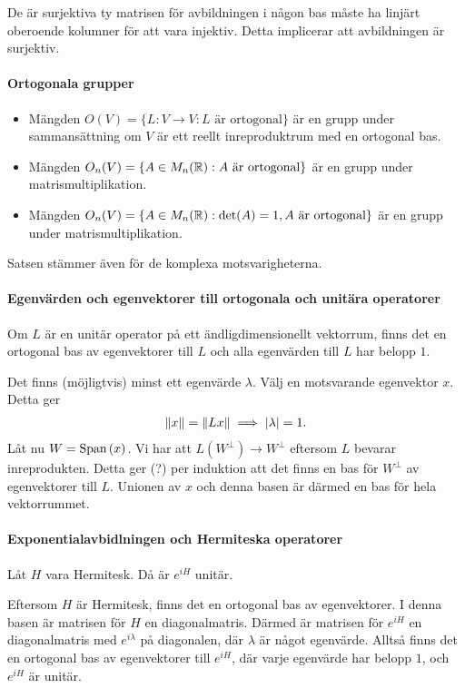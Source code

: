 De är surjektiva ty matrisen för avbildningen i någon bas måste ha linjärt oberoende kolumner för att vara injektiv. Detta implicerar att avbildningen är surjektiv.

\paragraph{Ortogonala grupper}
\begin{itemize}
	\item Mängden $O(V) = \{L: V\to V: L\text{ är ortogonal}\}$ är en grupp under sammansättning om $V$ är ett reellt inreproduktrum med en ortogonal bas.
	\item Mängden $O_{n}(V) = \{A\in M_{n}(\mathbb{R}): A\text{ är ortogonal}\}$ är en grupp under matrismultiplikation.
	\item Mängden $O_{n}(V) = \{A\in M_{n}(\mathbb{R}): \text{det}(A) = 1, A\text{ är ortogonal}\}$ är en grupp under matrismultiplikation.
\end{itemize}

Satsen stämmer även för de komplexa motsvarigheterna.

\proof

\paragraph{Egenvärden och egenvektorer till ortogonala och unitära operatorer}
Om $L$ är en unitär operator på ett ändligdimensionellt vektorrum, finns det en ortogonal bas av egenvektorer till $L$ och alla egenvärden till $L$ har belopp $1$.

\proof
Det finns (möjligtvis) minst ett egenvärde $\lambda$. Välj en motsvarande egenvektor $x$. Detta ger
\begin{align*}
	\norm{x} = \norm{Lx} \implies \abs{\lambda} = 1.
\end{align*}
Låt nu $W = \text{Span}\left(x\right)$. Vi har att $L(W^{\perp})\to W^{\perp}$ eftersom $L$ bevarar inreprodukten. Detta ger (?) per induktion att det finns en bas för $W^{\perp}$ av egenvektorer till $L$. Unionen av $x$ och denna basen är därmed en bas för hela vektorrummet.

\paragraph{Exponentialavbidlningen och Hermiteska operatorer}
Låt $H$ vara Hermitesk. Då är $e^{iH}$ unitär.

\proof
Eftersom $H$ är Hermitesk, finns det en ortogonal bas av egenvektorer. I denna basen är matrisen för $H$ en diagonalmatris. Därmed är matrisen för $e^{iH}$ en diagonalmatris med $e^{i\lambda}$ på diagonalen, där $\lambda$ är något egenvärde. Alltså finns det en ortogonal bas av egenvektorer till $e^{iH}$, där varje egenvärde har belopp $1$, och $e^{iH}$ är unitär.